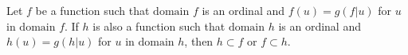 Let $f$ be a function such that $\text{domain } f$ is an ordinal and $f(u) = g(f|u)$ for $u$ in $\text{domain } f$. If $h$ is also a function such that $\text{domain } h$ is an ordinal and $h(u) = g(h|u)$ for $u$ in $\text{domain } h$, then $h \subset f$ or $f \subset h$.
